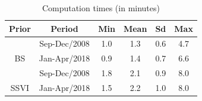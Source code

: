\begin{table}

\caption{\label{tab:times}Computation times (in minutes)}
\centering
\begin{tabular}[t]{cccccc}
\toprule
Prior & Period & Min & Mean & Sd & Max\\
\midrule
 & Sep-Dec/2008 & 1.0 & 1.3 & 0.6 & 4.7\\
\cmidrule{2-6}
\multirow{-2}{*}{\centering\arraybackslash BS} & Jan-Apr/2018 & 0.9 & 1.4 & 0.7 & 6.6\\
\cmidrule{1-6}
 & Sep-Dec/2008 & 1.8 & 2.1 & 0.9 & 8.0\\
\cmidrule{2-6}
\multirow{-2}{*}{\centering\arraybackslash SSVI} & Jan-Apr/2018 & 1.5 & 2.2 & 1.0 & 8.0\\
\bottomrule
\end{tabular}
\end{table}
